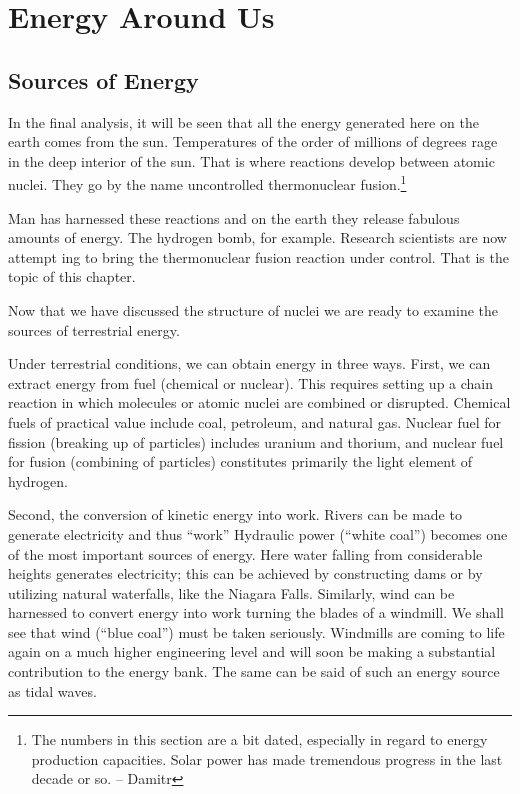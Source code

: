 

\cleardoublepage
\chapter{Energy Around Us}
\label{ch-06}

\section{Sources of Energy}
In the final analysis, it will be seen that all the energy generated here on the earth comes from the sun. Tem­peratures of the order of millions of degrees rage in the deep interior of the sun. That is where reactions develop between atomic nuclei. They go by the name uncontrolled thermonuclear fusion.\footnote{The numbers in this section are a bit dated, especially in regard to energy production capacities. Solar power has made tremendous progress in the last decade or so. -- Damitr}

Man has harnessed these reactions and on the earth they release fabulous amounts of energy. The hydrogen bomb, for example. Research scientists are now attempt­ ing to bring the thermonuclear fusion reaction under control. That is the topic of this chapter.

Now that we have discussed the structure of nuclei we are ready to examine the sources of terrestrial energy. 

Under terrestrial conditions, we can obtain energy in three ways. First, we can extract energy from fuel (chem­ical or nuclear). This requires setting up a chain reac­tion in which molecules or atomic nuclei are combined or disrupted. Chemical fuels of practical value include coal, petroleum, and natural gas. Nuclear fuel for fission (breaking up of particles) includes uranium and thorium, and nuclear fuel for fusion (combining of particles) con­stitutes primarily the light element of hydrogen.

Second, the conversion of kinetic energy into work. Rivers can be made to generate electricity and thus ``work'' Hydraulic power (``white coal'') becomes one of the most important sources of energy. Here water falling from considerable heights generates electricity; this can be achieved by constructing dams or by utilizing natural waterfalls, like the Niagara Falls. Similarly, wind can be harnessed to convert energy into work turning the blades of a windmill. We shall see that wind (``blue coal'') must be taken seriously. Windmills are coming to life again on a much higher engineering level and will soon be making a substantial contribution to the energy bank. The same can be said of such an energy source as tidal waves.

